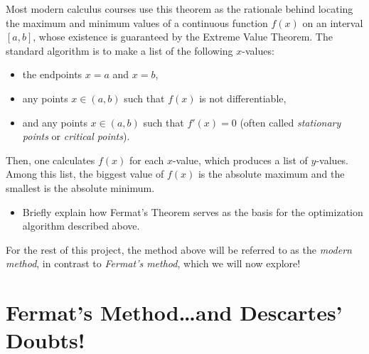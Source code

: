 \documentclass[11pt]{article}
\newcounter{tasknumb}
\newcommand{\tasknumb}[1]{\refstepcounter{tasknumb}\textmd{\textbf{$\fbox{$\fbox{Task \thetasknumb}$}$}}#1}
\newenvironment{task}[1][]%
 {\begin{itemize}
 \item[\tasknumb{#1}]  }
{
    \end{itemize}    }%
\begin{document}
\noindent\hrulefill

\vspace{0.1in}

Most modern calculus courses use this theorem as the rationale behind locating the maximum and minimum values of a continuous function $f(x)$ on an interval $[a,b]$, whose existence is guaranteed by the Extreme Value Theorem.  The standard algorithm is to make a list of the following $x$-values:
\begin{itemize}
    \item the endpoints $x=a$ and $x=b$,
    \item any points $x\in(a,b)$ such that $f(x)$ is not differentiable, 
    \item and any points $x\in(a,b)$ such that $f'(x)=0$ (often called \emph{stationary points} or \emph{critical points}).
\end{itemize}  Then, one calculates $f(x)$ for each $x$-value, which produces a list of $y$-values.  Among this list, the biggest value of $f(x)$ is the absolute maximum and the smallest is the absolute minimum. 

\begin{task}
Briefly explain how Fermat's Theorem serves as the basis for the optimization algorithm described above.
\end{task}

For the rest of this project, the method above will be referred to as the \emph{modern method}, in contrast to \emph{Fermat's method}, which we will now explore!

\section{Fermat's Method\ldots and Descartes' Doubts!}\label{Adequality}
\end{document}
